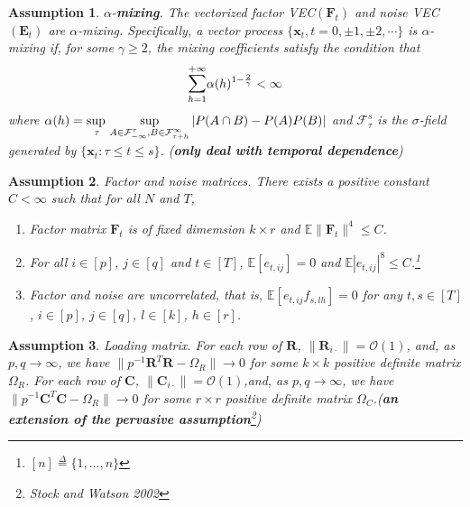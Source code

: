 \documentclass{article}[12pt]
\newtheorem{assumption}{Assumption}
\begin{document}
\begin{assumption}\label{assumption 1 1.7.1}
    $\alpha$-\textbf{mixing}. \normalfont The vectorized factor VEC$(\mathbf{F}_t)$ and noise VEC$(\mathbf{E}_t)$ are $\alpha$-mixing. Specifically, a vector process $\{\mathbf{x}_t, t=0, \pm 1,\pm 2,\cdots\}$ is $\alpha$-mixing if, for some $\gamma \geq 2$, the mixing coefficients satisfy the condition that
    $$\mathlarger{\sum}_{h=1}^{+\infty} \alpha(h)^{1-\frac{2}{\gamma}} < \infty$$
    where $\alpha(h) =  \adjustlimits\sup_{\tau}\sup_{A \in \mathcal{F}_{-\infty}^{\tau}, B \in \mathcal{F}_{\tau + h}^{\infty}}|P(A\cap B)-P(A)P(B)|$ and $\mathcal{F}_{\tau}^s$ is the $\sigma$-field generated by $\{\mathbf{x}_t:\tau \leq t \leq s\}$.
    (\textbf{\textit{only deal with temporal dependence}})
\end{assumption}
 
\begin{assumption}\label{assumption 2 1.7.1}
    Factor and noise matrices. \normalfont There exists a positive constant $C < \infty$ such that for all $N$ and $T$,
    \begin{enumerate}
        \item Factor matrix $\mathbf{F}_t$ is of fixed dimemsion $k \times r$ and $\mathbb{E}\lVert\mathbf{F}_t\rVert^4\leq C $.
        \item For all $i \in \left[p\right]$, $j \in \left[q\right]$ and $t \in \left[T\right]$, $\mathbb{E}\left[e_{t,ij}\right]=0$ and $\mathbb{E}|e_{t,ij}|^8 \leq C$.\footnote{$\left[n\right] \overset{\Delta}{=} \{1,\dots,n\}$}
        \item Factor and noise are uncorrelated, that is, $\mathbb{E}\left[e_{t,ij}f_{s,lh}\right]=0$ for any $t,s \in \left[T\right]$, $i \in \left[p\right]$, $j \in \left[q\right]$, $l \in \left[k\right]$, $h \in \left[r\right]$.
    \end{enumerate}
\end{assumption}

\begin{assumption}\label{assumption 3 1.7.1}
    Loading matrix. \normalfont For each row of $\mathbf{R}$, $\lVert\mathbf{R}_{i\cdot}\rVert = \mathcal{O}(1)$, and, as $p,q \rightarrow \infty$, we have $\lVert p^{-1}\mathbf{R}^T\mathbf{R}-\Omega_R\rVert \rightarrow 0$ for some $k \times k$ positive definite matrix $\Omega_R$. For each row of $\mathbf{C}$, $\lVert\mathbf{C}_{i\cdot}\rVert = \mathcal{O}(1)$,and, as $p,q \rightarrow \infty$, we have $\lVert p^{-1}\mathbf{C}^T\mathbf{C}-\Omega_R\rVert \rightarrow 0$ for some $r \times r$ positive definite matrix $\Omega_C$.(\textbf{\textit{an extension of the pervasive assumption}}\footnote{Stock and Watson 2002})
\end{assumption}
\end{document}
